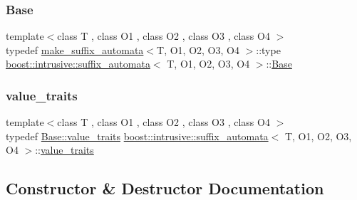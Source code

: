 \subsubsection{\texorpdfstring{Base}{Base}}
{\footnotesize\ttfamily template$<$class T , class O1 , class O2 , class O3 , class O4 $>$ \\
typedef \hyperlink{structboost_1_1intrusive_1_1make__suffix__automata}{make\+\_\+suffix\+\_\+automata}$<$T, O1, O2, O3, O4 $>$\+::type \hyperlink{classboost_1_1intrusive_1_1suffix__automata}{boost\+::intrusive\+::suffix\+\_\+automata}$<$ T, O1, O2, O3, O4 $>$\+::\hyperlink{classboost_1_1intrusive_1_1suffix__automata_af5152d681de2ae59737825d5b2c2b027}{Base}}

\mbox{\label{classboost_1_1intrusive_1_1suffix__automata_a159d8fbab457d5f8aae6ebb5a98b18c2}} 
\subsubsection{\texorpdfstring{value\+\_\+traits}{value\_traits}}
{\footnotesize\ttfamily template$<$class T , class O1 , class O2 , class O3 , class O4 $>$ \\
typedef \hyperlink{classboost_1_1intrusive_1_1suffix__automata__impl_abbf3dee8caf18613db903931801c6076}{Base\+::value\+\_\+traits} \hyperlink{classboost_1_1intrusive_1_1suffix__automata}{boost\+::intrusive\+::suffix\+\_\+automata}$<$ T, O1, O2, O3, O4 $>$\+::\hyperlink{classboost_1_1intrusive_1_1suffix__automata__impl_abbf3dee8caf18613db903931801c6076}{value\+\_\+traits}}



\subsection{Constructor \& Destructor Documentation}
\mbox{\label{classboost_1_1intrusive_1_1suffix__automata_a671eee511bab2df95ef036be104dcefa}} 
